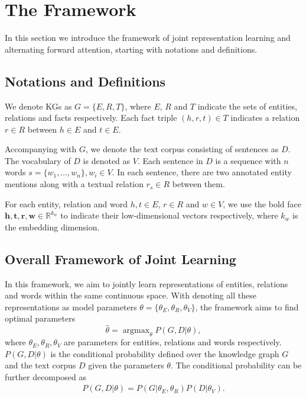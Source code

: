 \documentclass[letterpaper]{article} %
\begin{document}
\section{The Framework}
\label{sec:framework}

In this section we introduce the framework of joint representation learning and alternating forward attention, starting with notations and definitions.

\subsection{Notations and Definitions}

We denote KGs as $G = \{E, R, T\}$, where $E$, $R$ and $T$ indicate the sets of entities, relations and facts respectively. Each fact triple $(h, r, t) \in T$ indicates a relation $r \in R$ between $h \in E$ and $t \in E$.

Accompanying with $G$, we denote the text corpus consisting of sentences as $D$. The vocabulary of $D$ is denoted as $V$. Each sentence in $D$ is a sequence with $n$ words $s = \{w_1, \ldots, w_n\}, w_i \in V$. In each sentence, there are two annotated entity mentions along with a textual relation $r_s \in R$ between them. 

For each entity, relation and word $h, t \in E$, $r \in R$ and $w \in V$, we use the bold face $\mathbf{h}, \mathbf{t}, \mathbf{r}, \mathbf{w} \in \mathbb{R}^{k_w}$ to indicate their low-dimensional vectors respectively, where $k_w$ is the embedding dimension.



\subsection{Overall Framework of Joint Learning}
\label{sec:joint}


In this framework, we aim to jointly learn representations of entities, relations and words within the same continuous space. With denoting all these representations as model parameters $\theta = \{\theta_E, \theta_R, \theta_V\}$, the framework aims to find optimal parameters
\begin{equation}
\hat{\theta} = \mathop{\arg\max}_{\theta} P(G, D | {\theta}),
\end{equation}
where $\theta_E, \theta_R, \theta_V$ are parameters for entities, relations and words respectively. $P(G, D | {\theta})$ is the conditional probability defined over the knowledge graph $G$ and the text corpus $D$ given the parameters $\theta$. The conditional probability can be further decomposed as
\begin{align}
\label{eq:topeq}
P(G,D|{\theta}) = P(G|{\theta_E,\theta_R})P(D|{\theta_V}).
\end{align}
\end{document}
